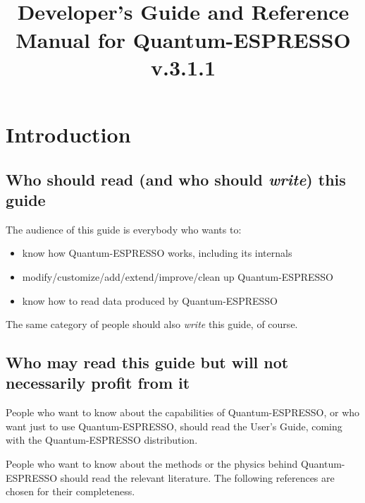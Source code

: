\documentclass[12pt,a4paper]{article}
\def\version{3.1.1}
\begin{document}
 

\author{}
\date{}
\title{
  \hfill%
  \vspace{1.5cm}
  \\
  \huge Developer's Guide and Reference Manual for Quantum-ESPRESSO
       v.\version
}
\maketitle

\tableofcontents

\clearpage

\section{Introduction}

\subsection{Who should read (and who should {\em write}) this guide}

The audience of this guide is everybody who wants to:
\begin{itemize}
  \item know how Quantum-ESPRESSO works, including its internals
  \item modify/customize/add/extend/improve/clean up Quantum-ESPRESSO
  \item know how to read data produced by Quantum-ESPRESSO
\end{itemize}
The same category of people should also {\em write} this guide, of course.

\subsection{Who may read this guide but will not necessarily
profit from it}

People who want to know about the capabilities of Quantum-ESPRESSO,
or who want just to use Quantum-ESPRESSO, should read the User's Guide, 
coming with the Quantum-ESPRESSO distribution.

People who want to know about the methods or the physics
behind Quantum-ESPRESSO should read the relevant literature. The
following references are chosen for their completeness.
\end{document}
